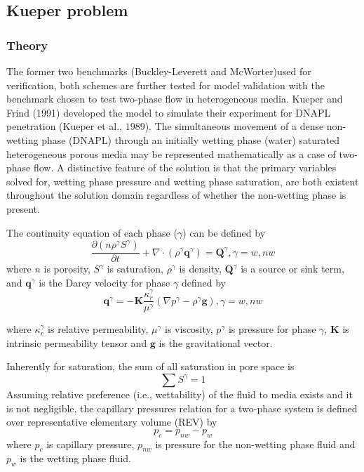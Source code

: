 \subsection{\upshape\textbf{Kueper problem}}
\subsubsection*{\upshape\textbf{Theory}}
The former two benchmarks (Buckley-Leverett and McWorter)used for verification, both schemes are further tested for model validation with the benchmark chosen to test two-phase flow in heterogeneous media. Kueper and Frind (1991) developed the model to simulate their experiment for DNAPL penetration (Kueper et al., $1989$). The simultaneous movement of a dense non-wetting phase (DNAPL) through an initially wetting phase (water) saturated heterogeneous porous media may be represented mathematically as a case of two-phase flow. A distinctive feature of the solution is that the primary variables solved for, wetting phase pressure and wetting phase saturation, are both existent throughout the solution domain regardless of whether the non-wetting phase is present.


The continuity equation of each phase ($\gamma$) can be defined by
\begin{equation}
\frac{\partial (n {\rho}^{\gamma} S^{\gamma})}{\partial t} + \nabla \cdot ({\rho}^{\gamma} \mathbf{q}^{\gamma}) = \mathbf{Q}^{\gamma}, \gamma=w, nw
\label{eq:mcwtMassEq}
\end{equation}
where $n$ is porosity, $S^{\gamma}$ is saturation, $\rho^{\gamma}$ is density, $\mathbf{Q}^{\gamma}$ is a source or sink term, and $\mathbf{q}^{\gamma}$ is the Darcy velocity for phase $\gamma$ defined by
\begin{equation}
\mathbf{q}^{\gamma}=-{\mathbf K} \frac{\kappa_r^{\gamma}}{\mu^{\gamma}}(\nabla p^{\gamma}-{\rho}^{\gamma} \mathbf{g}), \gamma=w, nw
\label{eq:mcwtFluxEq}
\end{equation}

where $\kappa_r^{\gamma}$ is relative permeability, $\mu^{\gamma}$ is viscosity, $p^{\gamma}$ is pressure for phase $\gamma$, $\textbf{K}$ is intrinsic permeability tensor and $\mathbf{g}$ is the gravitational vector.  


Inherently for saturation, the sum of all saturation in pore space is
\begin{equation}
{\sum S^{\gamma}}=1
\label{eq:mcwtFluxEq}
\end{equation}
Assuming relative preference (i.e., wettability) of the fluid to media exists and it is not negligible, the capillary pressures relation for a two-phase system is defined over representative elementary volume (REV) by 
\begin{equation}
p_c=p_{nw}-p_w
\label{eq:mcwtFluxEq}
\end{equation}                                                 
where $p_c$ is capillary pressure, $p_{nw}$ is pressure for the non-wetting phase fluid and $p_w$ is the wetting phase fluid. 


